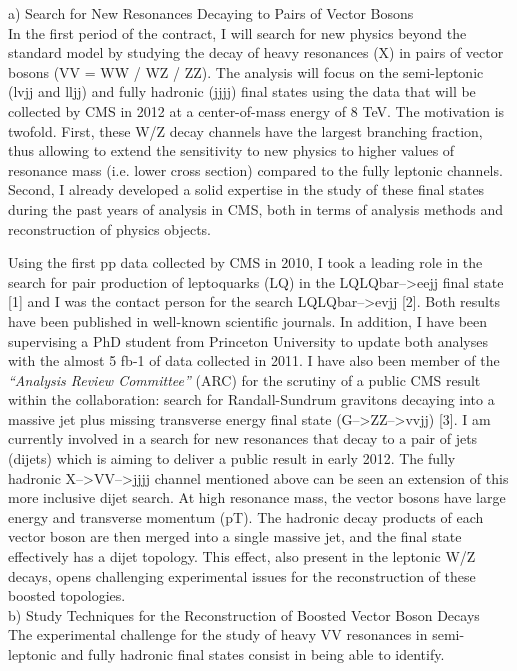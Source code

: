 \documentclass[10pt, a4paper]{article}
\begin{document}
a) Search for New Resonances Decaying to Pairs of Vector Bosons\\
In the first period of the contract, I will search for new physics beyond the 
standard model by studying the decay of heavy resonances (X) in pairs of vector bosons
(VV = WW / WZ / ZZ). The analysis will focus on the semi-leptonic (lvjj and lljj) and 
fully hadronic (jjjj) final states using the data that will be collected by CMS in 2012
at a center-of-mass energy of 8 TeV. 
The motivation is twofold. First, these W/Z decay channels have the largest 
branching fraction, thus allowing to extend the sensitivity to new physics to higher values of 
resonance mass (i.e. lower cross section) compared to the 
fully leptonic channels. Second, I already developed a solid expertise in 
the study of these final states during the past years of analysis in CMS, both in terms of 
analysis methods and reconstruction of physics objects. 

Using the first pp data collected by CMS in 2010, I took a leading role 
in the search for pair production of leptoquarks (LQ) in the LQLQbar-->eejj final state [1] and 
I was the contact person for the search LQLQbar-->evjj [2]. Both results have been published in 
well-known scientific journals. In addition, I have been supervising 
a PhD student from Princeton University to update both analyses with 
the almost 5 fb-1 of data collected in 2011.
I have also been member of the {\it``Analysis Review Committee''} (ARC) for the scrutiny of a public CMS result within the collaboration: search for Randall-Sundrum gravitons decaying into 
a massive jet plus missing transverse energy final state (G-->ZZ-->vvjj) [3]. 
I am currently involved in a search for new resonances that decay to a pair of jets (dijets)
which is aiming to deliver a public result in early 2012. The fully hadronic X-->VV-->jjjj channel 
mentioned above can be seen an extension of this more inclusive dijet search. At high 
resonance mass, the vector bosons have large energy and transverse momentum (pT). 
The hadronic decay products of each vector boson are then merged into a single massive jet, and 
the final state effectively has a dijet topology. This effect, also present in the leptonic W/Z decays, 
opens challenging experimental issues for the reconstruction of these boosted topologies.
\\ 

b) Study Techniques for the Reconstruction of Boosted Vector Boson Decays\\
The experimental challenge for the study of heavy VV resonances in semi-leptonic and 
fully hadronic final states consist in being able to identify.
\end{document}
